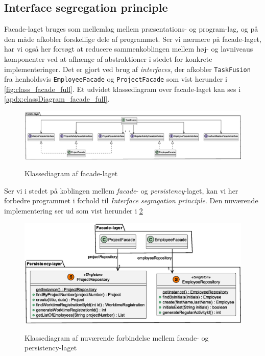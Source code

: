 \subsection{Interface segregation principle} \label{sec:solid_i}
Facade-laget bruges som mellemlag mellem præsentations- og program-lag, og på den måde afkobler forskellige dele af programmet. Ser vi nærmere på facade-laget, har vi også her forsøgt at reducere sammenkoblingen mellem høj- og lavniveaus komponenter ved at afhænge af abstraktioner i stedet for konkrete implementeringer. Det er gjort ved brug af \textit{interfaces}, der afkobler \texttt{TaskFusion} fra henholdsvis \texttt{EmployeeFacade} og \texttt{ProjectFacade} som vist herunder i \cref{fig:class_facade_full}. Et udvidet klassediagram over facade-laget kan ses i \cref{apdx:classDiagram_facade_full}.
\begin{figure}[H]
  \centering
  \caption{Klassediagram af facade-laget}
  \includegraphics[width = \textwidth]{ImplementationAndTest/Diagrams/ClassDiagrams/ClassDiagram_facade_simple.eps}
  \label{fig:class_facade_simple}
\end{figure}
Ser vi i stedet på koblingen mellem \textit{facade}- og \textit{persistency}-laget, kan vi her forbedre programmet i forhold til \textit{Interface segragation principle}. Den nuværende implementering ser ud som vist herunder i \cref{fig:class_facade_persistency_current}
\begin{figure}[H]
  \centering
  \caption{Klassediagram af nuværende forbindelse mellem facade- og persistency-laget}
  \includegraphics[width = 12cm]{ImplementationAndTest/Diagrams/ClassDiagrams/persistency_to_facade_example.eps}
  \label{fig:class_facade_persistency_current}
\end{figure}
